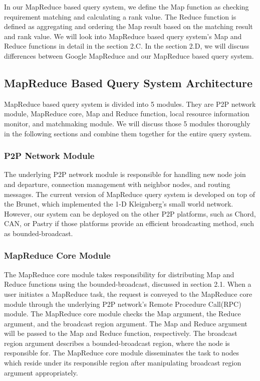 \documentclass{acm_proc_article-sp}
\begin{document}
In our MapReduce based query system, we define the Map function as checking requirement matching and calculating a rank value. The Reduce function is defined as 
aggregating and ordering the Map result based on the matching result and rank value. We will look into MapReduce based query system's Map and Reduce functions in detail in the section 2.C. 
In the section 2.D, we will discuss differences between Google MapReduce and our MapReduce based query system.

\subsection{MapReduce Based Query System Architecture}
MapReduce based query system is divided into 5 modules. They are P2P network module, MapReduce core, Map and Reduce function, local resource information monitor, and matchmaking module.
We will discuss those 5 modules thoroughly in the following sections and combine them together for the entire query system.
\subsubsection{P2P Network Module}
The underlying P2P network module is responsible for handling new node join and departure, connection management with neighbor nodes, and routing messages. 
The current version of MapReduce query system is developed on top of the Brunet\cite{brunet}, which implemented the 1-D Kleignberg's small world network\cite{small_world_network}.
However, our system can be deployed on the other P2P platforms, such as Chord\cite{chord}, CAN\cite{can}, or Pastry\cite{pastry} if those platforms
provide an efficient broadcasting method, such as bounded-broadcast. 
\subsubsection{MapReduce Core Module}
The MapReduce core module takes responsibility for distributing Map and Reduce functions using the bounded-broadcast, discussed in section 2.1. 
When a user initiates a MapReduce task, the request is conveyed to the MapReduce core module through the underlying P2P network's Remote Procedure Call(RPC) module. 
The MapReduce core module checks the Map argument, the Reduce argument, and the broadcast region argument. 
The Map and Reduce argument will be passed to the Map and Reduce function, respectively. 
The broadcast region argument describes a bounded-broadcast region, where the node is responsible for. 
The MapReduce core module disseminates the task to nodes which reside under its responsible region after manipulating broadcast region argument appropriately.
\end{document}
